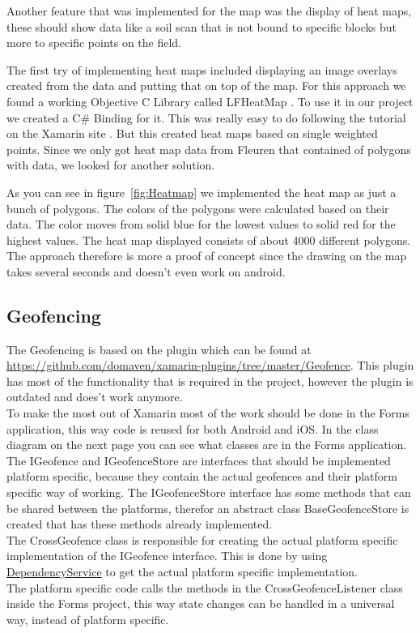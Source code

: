 Another feature that was implemented for the map was the display of heat maps, these should show data like a soil scan that is not bound to specific blocks but more to specific points on the field.

The first try of implementing heat maps included displaying an image \glspl{overlay} created from the data and putting that on top of the map. For this approach we found a working Objective C Library called LFHeatMap \cite{LFHeatMaps}. To use it in our project we created a C\# Binding for it.
This was really easy to do following the tutorial on the Xamarin site \cite{bindingtut}. But this created heat maps based on single weighted points. Since we only got heat map data from Fleuren that contained of polygons with data, we looked for another solution.

As you can see in figure~\ref{fig:Heatmap} we implemented the heat map as just a bunch of polygons. The colors of the polygons were calculated based on their data. The color moves from solid blue for the lowest values to solid red for the highest values. The heat map displayed consists of about 4000 different polygons. The approach therefore is more a proof of concept since the drawing on the map takes several seconds and doesn't even work on android.


\subsection{Geofencing}

The Geofencing is based on the plugin which can be found at \url{https://github.com/domaven/xamarin-plugins/tree/master/Geofence}. This plugin has most of the functionality that is required in the project, however the plugin is outdated and does't work anymore. \\
To make the most out of Xamarin most of the work should be done in the Forms application, this way code is reused for both Android and iOS. In the class diagram on the next page you can see what classes are in the Forms application. \\ The IGeofence and IGeofenceStore are interfaces that should be implemented platform specific, because they contain the actual geofences and their platform specific way of working. The IGeofenceStore interface has some methods that can be shared between the platforms, therefor an abstract class BaseGeofenceStore is created that has these methods already implemented.\\
The CrossGeofence class is responsible for creating the actual platform specific implementation of the IGeofence interface. This is done by using \href{https://developer.xamarin.com/guides/xamarin-forms/dependency-service/}{DependencyService} to get the actual platform specific implementation. \\
The platform specific code calls the methods in the CrossGeofenceListener class inside the Forms project, this way state changes can be handled in a universal way, instead of platform specific.


